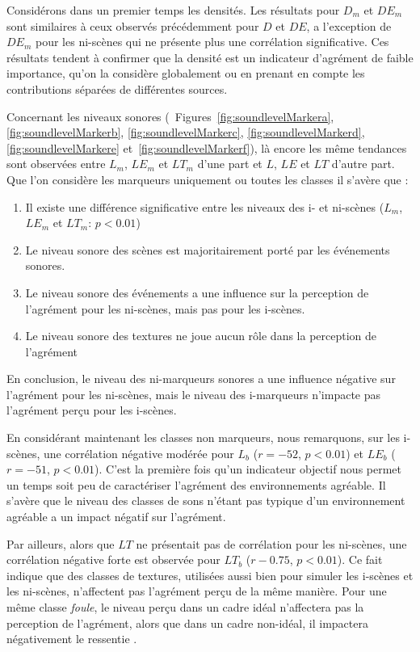 Considérons dans un premier temps les densités. Les résultats pour $D_m$ et $DE_m$ sont similaires à ceux observés précédemment pour $D$ et $DE$, a l'exception de $DE_m$ pour les ni-scènes qui ne présente plus une corrélation significative. Ces résultats tendent à confirmer que la densité est un indicateur d'agrément de faible importance, qu'on la considère globalement ou en prenant en compte les contributions séparées de différentes sources.


Concernant les niveaux sonores (\Cf~Figures~\ref{fig:soundlevelMarkera}, \ref{fig:soundlevelMarkerb}, \ref{fig:soundlevelMarkerc}, \ref{fig:soundlevelMarkerd}, \ref{fig:soundlevelMarkere} et~\ref{fig:soundlevelMarkerf}), là encore les même tendances sont observées entre $L_m$, $LE_m$ et $LT_m$ d'une part et $L$, $LE$ et $LT$ d'autre part. Que l'on considère les marqueurs uniquement ou toutes les classes il s'avère que :

\begin{enumerate}
\item Il existe une différence significative entre les niveaux des i- et ni-scènes ($L_m$, $LE_m$ et $LT_m$: $p<0.01$) 
\item Le niveau sonore des scènes est majoritairement porté par les événements sonores.
\item Le niveau sonore des événements a une influence sur la perception de l'agrément pour les ni-scènes, mais pas pour les i-scènes.
\item Le niveau sonore des textures ne joue aucun rôle dans la perception de l'agrément
\end{enumerate}

En conclusion, le niveau des ni-marqueurs sonores a une influence négative sur l'agrément pour les ni-scènes, mais le niveau des i-marqueurs n’impacte pas l'agrément perçu pour les i-scènes.

En considérant maintenant les classes non marqueurs, nous remarquons, sur les i-scènes, une corrélation négative modérée pour $L_b$  ($r=-52$, $p<0.01$) et $LE_b$ ($r=-51$, $p<0.01$). C'est la première fois qu'un indicateur objectif nous permet un temps soit peu de caractériser l'agrément des environnements agréable. Il s'avère que le niveau des classes de sons n'étant pas typique d'un environnement agréable a un impact négatif sur l'agrément. 

Par ailleurs, alors que $LT$ ne présentait pas de corrélation pour les ni-scènes, une corrélation négative forte est observée pour $LT_b$ ($r-0.75$, $p<0.01$). Ce fait indique que des classes de textures, utilisées aussi bien pour simuler les i-scènes et les ni-scènes, n'affectent pas l'agrément perçu de la même manière. Pour une même classe \emph{foule}, le niveau perçu dans un cadre idéal n'affectera pas la perception de l'agrément, alors que dans un cadre non-idéal, il impactera négativement le ressentie .


